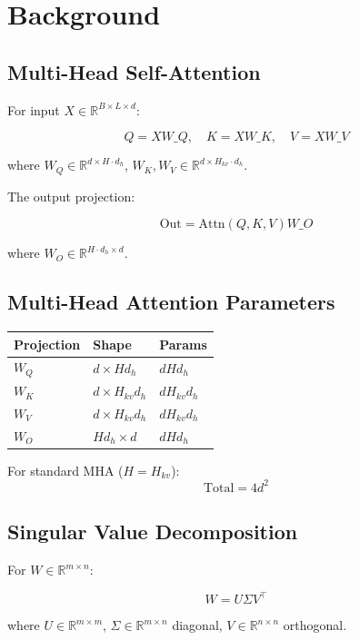 \section{Background}

\subsection{Multi-Head Self-Attention}

For input $X \in \mathbb{R}^{B \times L \times d}$:

\[
Q = X W\_Q, \quad K = X W\_K, \quad V = X W\_V
\]

where $W_Q \in \mathbb{R}^{d \times H \cdot d_h}$, $W_K, W_V \in \mathbb{R}^{d \times H_{kv} \cdot d_h}$.

The output projection:

\[
\text{Out} = \text{Attn}(Q, K, V) W\_O
\]

where $W_O \in \mathbb{R}^{H \cdot d_h \times d}$.

\subsection{Multi-Head Attention Parameters}

\begin{table}[H]
\centering
\small
\begin{tabular}{lll}
\toprule
\textbf{Projection} & \textbf{Shape} & \textbf{Params} \\
\midrule
$W_Q$ & $d \times H d_h$ & $d H d_h$ \\
$W_K$ & $d \times H_{kv} d_h$ & $d H_{kv} d_h$ \\
$W_V$ & $d \times H_{kv} d_h$ & $d H_{kv} d_h$ \\
$W_O$ & $H d_h \times d$ & $d H d_h$ \\
\bottomrule
\end{tabular}
\end{table}

For standard MHA ($H = H_{kv}$):
\[
\text{Total} = 4 d^2
\]

\subsection{Singular Value Decomposition}

For $W \in \mathbb{R}^{m \times n}$:

\[
W = U \Sigma V^\top
\]

where $U \in \mathbb{R}^{m \times m}$, $\Sigma \in \mathbb{R}^{m \times n}$ diagonal, 
$V \in \mathbb{R}^{n \times n}$ orthogonal.

